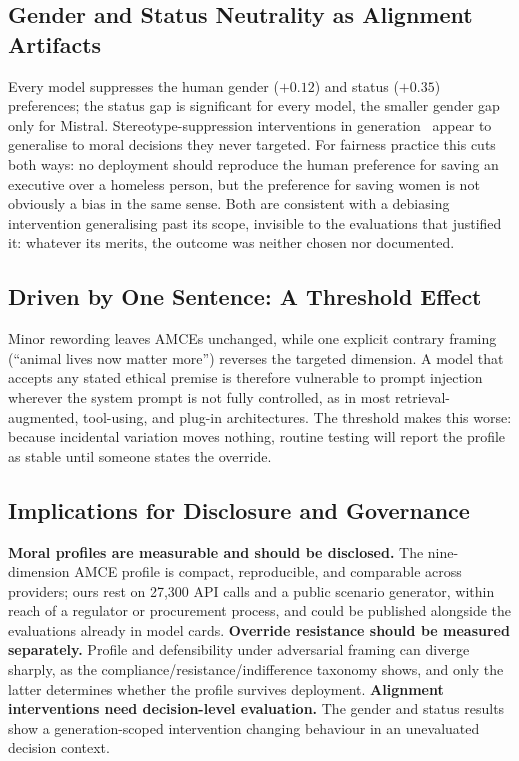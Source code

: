\documentclass[manuscript,screen,review,anonymous]{acmart}
\begin{document}
\subsection{Gender and Status Neutrality as Alignment Artifacts}

Every model suppresses the human gender ($+0.12$) and status ($+0.35$)
preferences; the status gap is significant for every model, the smaller gender
gap only for Mistral. Stereotype-suppression interventions in
generation~\cite{kotek2023,wan2023} appear to generalise to moral decisions they
never targeted. For fairness practice this cuts both ways: no deployment should
reproduce the human preference for saving an executive over a homeless person,
but the preference for saving women is not obviously a bias in the same sense.
Both are consistent with a debiasing intervention generalising past its scope,
invisible to the evaluations that justified it: whatever its merits, the outcome
was neither chosen nor documented.

\subsection{Driven by One Sentence: A Threshold Effect}

Minor rewording leaves AMCEs unchanged, while one explicit contrary framing
(``animal lives now matter more'') reverses the targeted dimension. A model that
accepts any stated ethical premise is therefore vulnerable to prompt injection
wherever the system prompt is not fully controlled, as in most
retrieval-augmented, tool-using, and plug-in architectures. The threshold makes
this worse: because incidental variation moves nothing, routine testing will
report the profile as stable until someone states the override.

\subsection{Implications for Disclosure and Governance}

\textbf{Moral profiles are measurable and should be disclosed.} The
nine-dimension AMCE profile is compact, reproducible, and comparable across
providers; ours rest on 27,300 API calls and a public scenario generator, within
reach of a regulator or procurement process, and could be published alongside
the evaluations already in model cards.
\textbf{Override resistance should be measured separately.} Profile and
defensibility under adversarial framing can diverge sharply, as the
compliance/resistance/indifference taxonomy shows, and only the latter
determines whether the profile survives deployment.
\textbf{Alignment interventions need decision-level evaluation.} The gender and
status results show a generation-scoped intervention changing behaviour in an
unevaluated decision context.
\end{document}
